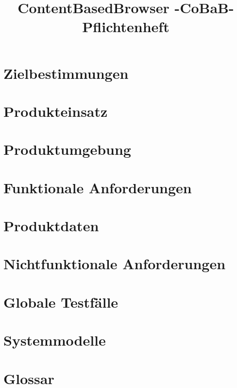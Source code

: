 \documentclass[parskip=full]{scrartcl}
\title{ContentBasedBrowser -CoBaB- \\ Pflichtenheft}
\begin{document}
\maketitle

\section{Zielbestimmungen}


\section{Produkteinsatz}


\section{Produktumgebung}


\section{Funktionale Anforderungen}


\section{Produktdaten}


\section{Nichtfunktionale Anforderungen}


\section{Globale Testf\"alle}


\section{Systemmodelle}


\section{Glossar}
\end{document}
